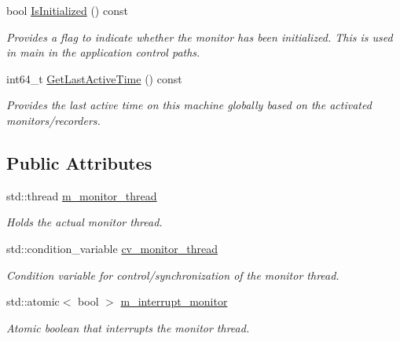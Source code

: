 \begin{DoxyCompactItemize}
bool \mbox{\hyperlink{classEventDetect_1_1Monitor_a8d0a2609e4c8613bc020e239d280dfb5}{Is\+Initialized}} () const
\begin{DoxyCompactList}\small\item\em Provides a flag to indicate whether the monitor has been initialized. This is used in main in the application control paths. \end{DoxyCompactList}\item 
int64\+\_\+t \mbox{\hyperlink{classEventDetect_1_1Monitor_a8abba216129439752a569239173fea87}{Get\+Last\+Active\+Time}} () const
\begin{DoxyCompactList}\small\item\em Provides the last active time on this machine globally based on the activated monitors/recorders. \end{DoxyCompactList}\end{DoxyCompactItemize}
\subsection*{Public Attributes}
\begin{DoxyCompactItemize}
\item 
\mbox{\label{classEventDetect_1_1Monitor_aa132ddeed9eb332078dc32bfa3dd3f6d}} 
std\+::thread \mbox{\hyperlink{classEventDetect_1_1Monitor_aa132ddeed9eb332078dc32bfa3dd3f6d}{m\+\_\+monitor\+\_\+thread}}
\begin{DoxyCompactList}\small\item\em Holds the actual monitor thread. \end{DoxyCompactList}\item 
\mbox{\label{classEventDetect_1_1Monitor_aee960d904e743274f0ad54aa5ca4dde3}} 
std\+::condition\+\_\+variable \mbox{\hyperlink{classEventDetect_1_1Monitor_aee960d904e743274f0ad54aa5ca4dde3}{cv\+\_\+monitor\+\_\+thread}}
\begin{DoxyCompactList}\small\item\em Condition variable for control/synchronization of the monitor thread. \end{DoxyCompactList}\item 
\mbox{\label{classEventDetect_1_1Monitor_af9810df66ec16b2109994540b298024b}} 
std\+::atomic$<$ bool $>$ \mbox{\hyperlink{classEventDetect_1_1Monitor_af9810df66ec16b2109994540b298024b}{m\+\_\+interrupt\+\_\+monitor}}
\begin{DoxyCompactList}\small\item\em Atomic boolean that interrupts the monitor thread. \end{DoxyCompactList}\end{DoxyCompactItemize}
